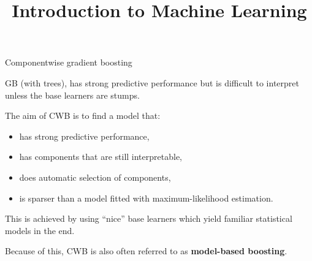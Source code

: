 \documentclass[11pt,compress,t,notes=noshow, xcolor=table]{beamer}
\title{Introduction to Machine Learning}
\date{}
\begin{document}


\begin{vbframe}{Componentwise gradient boosting}

GB (with trees), has strong predictive
performance but is difficult to interpret unless the base learners are stumps.

\lz

The aim of CWB is to find a model that:

\begin{itemize}
  \item
    has strong predictive performance,

  \item
    has components that are still interpretable,

  \item
    does automatic selection of components,

  \item
    is sparser than a model fitted with maximum-likelihood estimation.
\end{itemize}

\lz

This is achieved by using \enquote{nice} base learners which yield familiar
statistical models
in the end.

\lz

Because of this, CWB is also often referred to as \textbf{model-based boosting}.

\end{vbframe}

\end{document}
